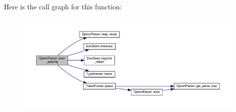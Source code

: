 Here is the call graph for this function\-:
\nopagebreak
\begin{figure}[H]
\begin{center}
\leavevmode
\includegraphics[width=350pt]{classOptionParser_a672b8b902d2c30dcb54c5d8a5481baaa_cgraph}
\end{center}
\end{figure}


